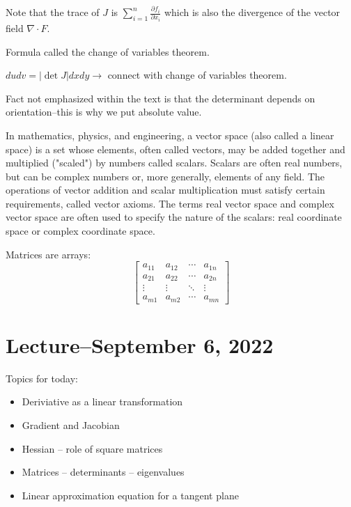 \documentclass{scrreprt}
\begin{document}
\begin{remark}
	Note that the trace of $J$ is $\sum_{i=1}^{n}\frac{\partial f_i}{\partial x_i}$ which
	is also the divergence of the vector field $\nabla \cdot F$.
\end{remark}

Formula called the change of variables theorem.

$dudv=|\det J|dxdy\rightarrow $ connect with change of variables theorem.

Fact not emphasized within the text is that the determinant depends on
orientation--this is why we put absolute value.

\begin{definition}
	In mathematics, physics, and engineering, a vector space (also called a
	linear space) is a set whose elements, often called vectors, may be added
	together and multiplied ("scaled") by numbers called scalars.
	Scalars are often real numbers, but can be complex numbers or, more
	generally, elements of any field. The operations of vector addition and
	scalar multiplication must satisfy certain requirements, called vector
	axioms. The terms real vector space and complex vector space are often used
	to specify the nature of the scalars: real coordinate space or complex coordinate space.
\end{definition}

Matrices are arrays:
\[
	\begin{bmatrix}
		a_{11} & a_{12} & \cdots & a_{1n} \\
		a_{21} & a_{22} & \cdots & a_{2n} \\
		\vdots & \vdots & \ddots & \vdots \\
		a_{m1} & a_{m2} & \cdots & a_{mn}
	\end{bmatrix}
\]

\section{Lecture--September 6, 2022}

Topics for today:
\begin{itemize}
	\item Deriviative as a linear transformation
	\item Gradient and Jacobian
	\item Hessian -- role of square matrices
	\item Matrices -- determinants -- eigenvalues
	\item Linear approximation equation for a tangent plane
\end{itemize}
\end{document}
